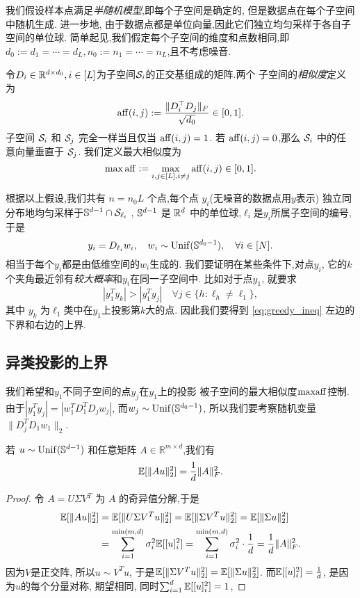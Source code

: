 我们假设样本点满足\emph{半随机模型},即每个子空间是确定的,
但是数据点在每个子空间中随机生成. 进一步地,
由于数据点都是单位向量,因此它们独立均匀采样于各自子空间的单位球.
简单起见,我们假定每个子空间的维度和点数相同,即\(d_0:= d_1=\cdots=d_L,
n_0:= n_1=\cdots=n_L\),且不考虑噪音.

令\(D_i\in \R^{d\times d_0}, i\in [L]\)为子空间\(\cS_i\)的正交基组成的矩阵.两个
子空间的\emph{相似度}定义为
\begin{align*}
  \aff(i,j) := \frac{\|D_i^\top D_j\|_F}{\sqrt{d_0}} \in [0, 1].
\end{align*}
子空间 \(\cS_i\) 和 \(\cS_j\) 完全一样当且仅当 \(\aff(i,j) = 1\).
若 \(\aff(i,j) = 0\),那么 \(\cS_i\) 中的任意向量垂直于 \(\cS_j\).
我们定义最大相似度为
\[ \max \aff := \max_{i,j \in [L], i \neq j} \aff(i,j) \in [0,1].\]

根据以上假设,我们共有 \(n = n_0 L\) 个点,每个点 \(y_i\)(无噪音的数据点用\(y\)表示)
独立同分布地均匀采样于\(\S^{d-1} \cap \cS_{\ell_i}\) ,
\(\S^{d-1}\) 是 \(\R^d\) 中的单位球,\(\ell_i\)是\(y_i\)所属子空间的编号,于是
\[
  y_i = D_{\ell_i} w_i ,\quad w_i \sim \Unif(\S^{d_0-1}) ,\quad
  \forall i \in [N].
\]
相当于每个\(y_i\)都是由低维空间的\(w_i\)生成的.
我们要证明在某些条件下,对点\(y_i\),
它的\(k\)个夹角最近邻有\emph{较大概率}和\(y_i\)在同一子空间中.
比如对于点\(y_1\), 就要求
\begin{equation}
  |y_1^T y_k|>|y_1^T y_j| \quad \forall j \in \{h:\ell_h \ne \ell_1\},
  \label{eq:greedy_ineq}
\end{equation}
其中 \(y_k\) 为\(\ell_1\)类中在\(y_1\)上投影第\(k\)大的点.
因此我们要得到 \eqref{eq:greedy_ineq} 左边的下界和右边的上界.

\subsection{异类投影的上界}
我们希望和\(y_1\)不同子空间的点\(y_j\)在\(y_1\)上的投影
被子空间的最大相似度\(\maff\)控制.
由于\(|y_1^T y_j| = |w_1^T D_1^T D_j w_j|\), 而\(w_j \sim \Unif(\S^{d_0-1})\),
所以我们要考察随机变量\(\|D_j^T D_1 w_1\|_2\).

\begin{lemma} \label{lem:expectation}
  若 \(u \sim \Unif(\mathbb{S}^{d-1})\) 和任意矩阵 
  \(A \in \mathbb{R}^{m \times d}\),我们有
  \[ \E[\|Au\|_2^2] = \frac{1}{d} \|A\|_F^2. \]
\end{lemma}
\begin{proof}
令 \(A = U \Sigma V^T\) 为 \(A\) 的奇异值分解,于是
\begin{align*}
  \E[\|Au\|_2^2] &= \E[\|U \Sigma V^T u\|_2^2]= \E[\|\Sigma V^Tu\|_2^2] 
  = \E[\|\Sigma u\|_2^2]\\
  &= \sum_{i=1}^{\min(m,d)} \sigma_i^2 \E[ [u]_i^2] 
  = \sum_{i=1}^{\min(m,d)} \sigma_i^2 \cdot \frac{1}{d} = \frac{1}{d} \|A\|_F^2.
\end{align*}
因为\(V\)是正交阵, 所以\(u\sim V^T u\), 于是\(\E[\|\Sigma V^Tu\|_2^2]
=\E[\|\Sigma u\|_2^2]\). 而\(\E[[u]_i^2] = \frac{1}{d}\), 
是因为\(u\)的每个分量对称, 期望相同, 同时\(\sum_{i=1}^d \E[ [u]_i^2] = 1 \),
\end{proof}

